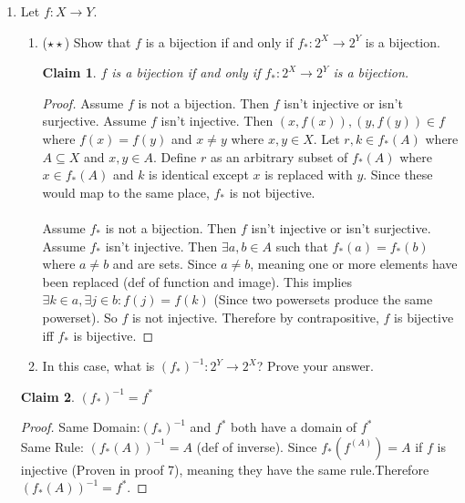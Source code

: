 \documentclass[11pt]{letter}
\newtheorem{claim}{Claim}
\theoremstyle{definition}
\begin{document}
\begin{description}
\begin{enumerate}
\begin{enumerate}
			\end{enumerate}
		\item Let $f:X\rightarrow Y$. 
				\begin{enumerate}
                                \item ($\star\star$) Show that $f$ is a bijection if and only if $f_*:2^X\rightarrow 2^Y$ is a bijection.
                                  \begin{claim}
                                    $f$ is a bijection if and only if $f_*:2^X\rightarrow 2^Y$ is a bijection.
                                  \end{claim}
                                  \begin{proof}
                                      Assume $f$ is not a bijection. Then $f$ isn't injective or isn't surjective. Assume $f$ isn't injective. Then $(x,f(x)),(y,f(y))\in f$ where $f(x)=f(y)$ and $x\neq y$ where $x,y\in X$. Let $r,k\in f_*(A)$ where $A\subseteq X$ and $x,y\in A$. Define $r$ as an arbitrary subset of $f_*(A)$ where $x\in f_*(A)$ and $k$ is identical except $x$ is replaced with $y$. Since these would map to the same place, $f_*$ is not bijective. \\ \\
  Assume $f_*$ is not a bijection. Then $f$ isn't injective or isn't surjective. Assume $f_*$ isn't injective. Then $\exists a,b\in A$ such that $f_*(a)=f_*(b)$ where $a\neq b$ and are sets. Since $a\neq b$, meaning one or more elements have been replaced (def of function and image). This implies $\exists k\in a, \exists j\in b: f(j)=f(k)$ (Since two powersets produce the same powerset). So $f$ is not injective.
  Therefore by contrapositive, $f$ is bijective iff $f_*$ is bijective.
                                  \end{proof}
                                  
                                  
                                  
					\item In this case, what is $(f_*)^{-1}:2^Y\rightarrow 2^X$? Prove your answer.
                                        \end{enumerate}
                                        \begin{claim}
                                          $(f_*)^{-1}=f^*$
                                        \end{claim}
                                        \begin{proof}
                                            Same Domain:$(f_*)^{-1}$ and $f^*$ both have a domain of $f^*$\\
  Same Rule: $(f_*(A))^{-1}=A$ (def of inverse). Since $f_*(f^(A))=A$ if $f$ is injective (Proven in proof 7), meaning they have the same rule.Therefore $(f_*(A))^{-1}=f^*$.
                                        \end{proof}
                                        
	\end{enumerate}		
	
	\end{description}
\end{document}
